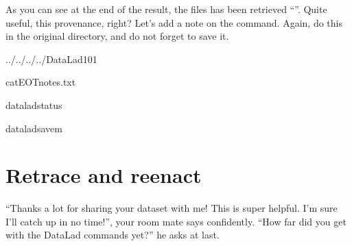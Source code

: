 \sphinxAtStartPar
As you can see at the end of the  result, the files has been retrieved “”.
Quite useful, this provenance, right?
Let’s add a note on the  command.
Again, do this in the original  directory, and do not forget to save it.

\begin{sphinxVerbatim}[commandchars=\\\{\}]
../../../../DataLad\PYGZhy{}101

cat\PYGZlt{}\PYGZlt{}EOT\PYGZgt{}\PYGZgt{}notes.txt

\end{sphinxVerbatim}

\begin{sphinxVerbatim}[commandchars=\\\{\}]
dataladstatus
\end{sphinxVerbatim}

\begin{sphinxVerbatim}[commandchars=\\\{\}]
dataladsave\PYGZhy{}m
\end{sphinxVerbatim}

\sphinxstepscope

\ignorespaces 

\section{Retrace and reenact}
\label{\detokenize{basics/101-118-sharelocal3:retrace-and-reenact}}\label{\detokenize{basics/101-118-sharelocal3:sharelocal3}}\label{\detokenize{basics/101-118-sharelocal3:index-0}}\label{\detokenize{basics/101-118-sharelocal3::doc}}
\sphinxAtStartPar
“Thanks a lot for sharing your dataset with me! This
is super helpful. I’m sure I’ll catch up in no time!”,
your room mate says confidently. “How far did you get
with the DataLad commands yet?” he asks at last.


